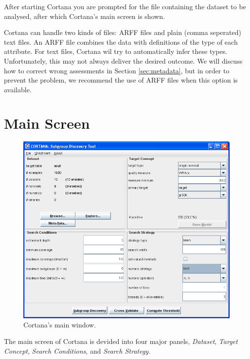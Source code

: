 \documentclass{article}
\begin{document}
After starting Cortana you are prompted for the file containing the dataset
to be analysed, after which Cortana's main screen is shown.

Cortana can handle two kinds of files: ARFF files and
plain (comma seperated) text files.  
An ARFF file combines the data with definitions of the \gls{type} of
each attribute.  
For text files, Cortana wil try to automatically infer these \gls{type}s.
Unfortunately, this may not always deliver the desired outcome.  We will
discuss how to correct wrong assessments in Section \ref{sec:metadata}, but
in order to prevent the problem, we recommend the use of ARFF files when
this option is available.

\section{Main Screen}

\begin{figure}
\begin{center}
\includegraphics[width=\textwidth]{mainwindow.png}
\caption{Cortana's main window.}
\label{fig:mainwindow}
\end{center}
\end{figure}

The main screen of Cortana is devided into four major panels,
\emph{Dataset}, \emph{Target Concept}, \emph{Search Conditions}, and
\emph{Search Strategy}.
\end{document}
